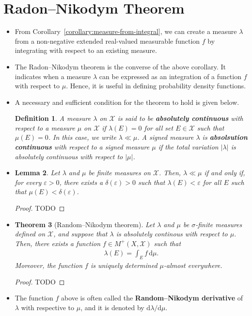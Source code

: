 \documentclass[10pt]{article}
\newtheorem{lemma}{Lemma}
\newtheorem{theorem}[lemma]{Theorem}
\newtheorem{definition}[lemma]{Definition}
\newcommand{\dee}{\mathrm{d}}
\newcommand{\mcal}[1]{\mathcal{#1}}
\begin{document}
\section{Radon--Nikodym Theorem}

\begin{itemize}
  \item From Corollary~\ref{corollary:measure-from-integral}, we can create a measure $\lambda$ from a non-negative extended real-valued measurable function $f$ by integrating with respect to an existing measure.
  
  \item The Radon--Nikodym theorem is the converse of the above corollary. It indicates when a measure $\lambda$ can be expressed as an integration of a function $f$ with respect to $\mu$. Hence, it is useful in defining probability density functions.
  
  \item A necessary and sufficient condition for the theorem to hold is given below.
  \begin{definition}
    A measure $\lambda$ on $\mcal{X}$ is said to be {\bf absolutely continuous} with respect to a measure $\mu$ on $\mcal{X}$ if $\lambda(E) = 0$ for all set $E \in \mcal{X}$ such that $\mu(E) = 0$. In this case, we write $\lambda \ll \mu$. A signed measure $\lambda$ is {\bf absolsution continuous} with respect to a signed measure $\mu$ if the total variation $|\lambda|$ is absolutely continuous with respect to $|\mu|$.
  \end{definition}

  \item \begin{lemma}
    Let $\lambda$ and $\mu$ be finite measures on $\mcal{X}$. Then, $\lambda \ll \mu$ if and only if, for every $\varepsilon > 0$, there exists a $\delta(\varepsilon) > 0$ such that $\lambda(E) < \varepsilon$ for all $E$ such that $\mu(E) < \delta(\varepsilon)$.
  \end{lemma}

  \begin{proof}
    TODO
  \end{proof}

  \item \begin{theorem}[Random--Nikodym theorem]
    Let $\lambda$ and $\mu$ be $\sigma$-finite measures defined on $\mcal{X}$, and suppose that $\lambda$ is absolutely continous with respect to $\mu$. Then, there exists a function $f \in M^+(X,\mcal{X})$ such that 
    \begin{align*}
      \lambda(E) = \int_E f\, \dee\mu.
    \end{align*}
    Moreover, the function $f$ is uniquely determined $\mu$-almost everywhere.
  \end{theorem}

  \begin{proof}
    TODO
  \end{proof}

  \item The function $f$ above is often called the {\bf Random--Nikodym derivative} of $\lambda$ with respective to $\mu$, and it is denoted by $\dee \lambda / \dee \mu$.
  
\end{itemize}


  
\end{document}
